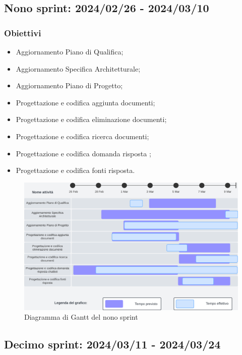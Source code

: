 \subsection{Nono sprint: 2024/02/26 - 2024/03/10}
\subsubsection{Obiettivi}
\begin{itemize}[itemsep=-2pt]
    \item Aggiornamento Piano di Qualifica;
    \item Aggiornamento Specifica Architetturale;
    \item Aggiornamento Piano di Progetto;
    \item Progettazione e codifica aggiunta documenti;
    \item Progettazione e codifica eliminazione documenti;
    \item Progettazione e codifica ricerca documenti;
    \item Progettazione e codifica domanda risposta ;
    \item Progettazione e codifica fonti risposta.
\end{itemize}

\begin{figure}[h!]
    \centering
    \includegraphics[width=\textwidth]{Roadmap9sprint.png}
    \caption{Diagramma di Gantt del nono sprint}
    \label{fig:roadmaps9s} 
\end{figure}

\newpage

\subsection{Decimo sprint: 2024/03/11 - 2024/03/24}
